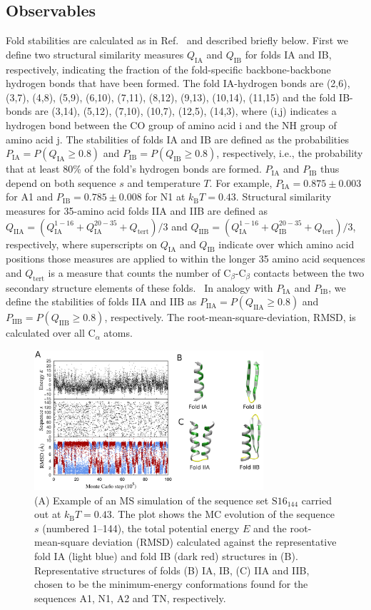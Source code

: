 \documentclass[
aip,
rsi,%
amsmath,amssymb,
reprint,%
]{revtex4-1}
\newcommand	 {\sbar}	{{s}}
\newcommand	 {\kb}		{{k_\mathrm{B}}}
\newcommand {\QIA}	{{Q_\mathrm{IA}}}
\newcommand {\QIB}	{{Q_\mathrm{IB}}}
\newcommand {\QIIA}	{{Q_\mathrm{IIA}}}
\newcommand {\QIIB}	{{Q_\mathrm{IIB}}}
\newcommand {\PIA}    	{{P_\mathrm{IA}}}
\newcommand {\PIB}    	{{P_\mathrm{IB}}}
\newcommand {\PIIA}    	{{P_\mathrm{IIA}}}
\newcommand {\PIIB}    	{{P_\mathrm{IIB}}}
\begin{document}
\subsection{Observables}

Fold stabilities are calculated as in Ref.~ and described briefly below. First we define two structural similarity measures $\QIA$ and $\QIB$ for folds IA and IB, respectively, indicating the fraction of the fold-specific backbone-backbone hydrogen bonds that have been formed. The fold IA-hydrogen bonds are (2,6), (3,7), (4,8), (5,9), (6,10), (7,11), (8,12), (9,13), (10,14), (11,15) and the fold IB-bonds are (3,14), (5,12), (7,10), (10,7), (12,5), (14,3), where (i,j) indicates a hydrogen bond between the CO group of amino acid i and the NH group of amino acid j. The stabilities of folds IA and IB are defined as the probabilities $\PIA = P(\QIA\ge0.8)$ and $\PIB = P(\QIB\ge0.8)$, respectively, i.e., the probability that at least 80\% of the fold's hydrogen bonds are formed. $\PIA$ and $\PIB$ thus depend on both sequence $\sbar$ and temperature $T$. For example, $\PIA=0.875\pm 0.003$ for A1 and $\PIB=0.785\pm0.008$ for N1 at $\kb T = 0.43$. Structural similarity measures for 35-amino acid folds IIA and IIB are defined as $\QIIA = ( Q_\mathrm{IA}^\mathrm{1-16} + Q_\mathrm{IA}^\mathrm{20-35} + Q_\mathrm{tert} ) / 3$ and $\QIIB = ( Q_\mathrm{IA}^\mathrm{1-16} + Q_\mathrm{IB}^\mathrm{20-35} + Q_\mathrm{tert} ) / 3$, respectively, where superscripts on $\QIA$ and $\QIB$ indicate over which amino acid positions those measures are applied to within the longer 35 amino acid sequences and $Q_\mathrm{tert}$ is a measure that counts the number of $\mathrm{C}_\beta$-$\mathrm{C}_\beta$ contacts between the two secondary structure elements of these folds.~\cite{Holzgrafe2015} In analogy with $\PIA$ and $\PIB$, we define the stabilities of folds IIA and IIB as $\PIIA = P(\QIIA\ge0.8)$ and $\PIIB = P(\QIIB\ge0.8)$, respectively. The root-mean-square-deviation, RMSD, is calculated over all $\mathrm{C}_\alpha$ atoms.

\begin{figure}
\includegraphics[width=8.5cm]{Fig2}
\caption{(A) Example of an MS simulation of the sequence set $\mathrm{S16}_{144}$ carried out at $\kb T = 0.43$. The plot shows the MC evolution of the sequence $\sbar$ (numbered 1--144), the total potential energy $E$ and the root-mean-square deviation (RMSD) calculated against the representative fold IA (light blue) and fold IB (dark red) structures in (B). Representative structures of folds (B) IA, IB, (C) IIA and IIB, chosen to be the minimum-energy conformations found for the sequences A1, N1, A2 and TN, respectively. }
\end{figure}
\end{document}
